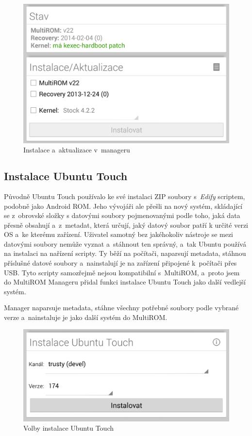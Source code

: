\documentclass[12pt, a4paper, oneside]{article}
\newcommand{\It}{\textit}  %
\begin{document}
\begin{figure}[H]
\begin{center}
 \includegraphics[width=\textwidth]{img/mgr_install.png}
\caption{Instalace a~aktualizace v~manageru}
\end{center}
\end{figure}

\subsection{Instalace Ubuntu Touch}
Původně Ubuntu Touch používalo ke své instalaci ZIP soubory s~\It{Edify} scriptem, podobně jako Android ROM. Jeho vývojáři ale přešli na nový systém, skládající se z~obrovské složky s datovými soubory pojmenovanými podle toho, jaká data přesně obsahují a~z~metadat, která určují, jaký datový soubor patří k určité verzi OS a~ke kterému zařízení. Uživatel samotný bez jakéhokoliv nástroje se mezi datovými soubory nemůže vyznat a~stáhnout ten správný, a~tak Ubuntu používá na instalaci na nařízení scripty. Ty běží na počítači, naparsují metadata, stáhnou příslušné datové soubory a~nainstalují je na zařízení připojené k~počítači přes USB. Tyto scripty samozřejmě nejsou kompatibilní s~MultiROM, a~proto jsem do MultiROM Manageru přidal funkci instalace Ubuntu Touch jako další vedlejší systém.

Manager naparsuje metadata, stáhne všechny potřebné soubory podle vybrané verze a~nainstaluje je jako další systém do MultiROM.

\begin{figure}[H]
\begin{center}
 \includegraphics[width=\textwidth]{img/mgr_ubuntu.png}
\caption{Volby instalace Ubuntu Touch}
\end{center}
\end{figure}
\end{document}
